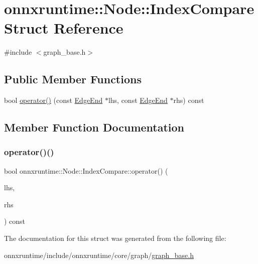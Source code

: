 \hypertarget{structonnxruntime_1_1Node_1_1IndexCompare}{}\section{onnxruntime\+:\+:Node\+:\+:Index\+Compare Struct Reference}
\label{structonnxruntime_1_1Node_1_1IndexCompare}


{\ttfamily \#include $<$graph\+\_\+base.\+h$>$}

\subsection*{Public Member Functions}
\begin{DoxyCompactItemize}
\item 
bool \mbox{\hyperlink{structonnxruntime_1_1Node_1_1IndexCompare_a0ae571adbf92b47431b39838fd4b976a}{operator()}} (const \mbox{\hyperlink{classonnxruntime_1_1Node_1_1EdgeEnd}{Edge\+End}} $\ast$lhs, const \mbox{\hyperlink{classonnxruntime_1_1Node_1_1EdgeEnd}{Edge\+End}} $\ast$rhs) const
\end{DoxyCompactItemize}


\subsection{Member Function Documentation}
\mbox{\label{structonnxruntime_1_1Node_1_1IndexCompare_a0ae571adbf92b47431b39838fd4b976a}} 
\subsubsection{\texorpdfstring{operator()()}{operator()()}}
{\footnotesize\ttfamily bool onnxruntime\+::\+Node\+::\+Index\+Compare\+::operator() (\begin{DoxyParamCaption}\item[{const \mbox{\hyperlink{classonnxruntime_1_1Node_1_1EdgeEnd}{Edge\+End}} $\ast$}]{lhs,  }\item[{const \mbox{\hyperlink{classonnxruntime_1_1Node_1_1EdgeEnd}{Edge\+End}} $\ast$}]{rhs }\end{DoxyParamCaption}) const\hspace{0.3cm}{\ttfamily [inline]}}



The documentation for this struct was generated from the following file\+:\begin{DoxyCompactItemize}
\item 
onnxruntime/include/onnxruntime/core/graph/\mbox{\hyperlink{graph__base_8h}{graph\+\_\+base.\+h}}\end{DoxyCompactItemize}
